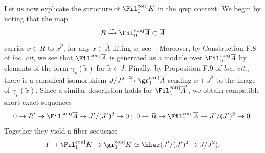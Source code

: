 \documentclass[10pt]{amsart}
\begin{document}
\begin{remark}
\label{rem:fil_1_conj_qrsp}
Let us now explicate the structure of $\Fil^{\mathrm{conj}}_1\overline{K}$ in the qrsp context. We begin by noting that the map 
\[
R\xrightarrow{\simeq}\Fil^{\mathrm{conj}}_0\overline{A}\subset \overline{A}
\]
carries $x\in R$ to $\tilde{x}^p$, for any $\tilde{x}\in \overline{A}$ lifting $x$; see~\cite[Remark F.7]{bhatt2022absolute}. Moreover, by Construction F.8 of \emph{loc. cit}, we see that 
$\Fil^{\mathrm{conj}}_1\overline{A}$ is generated as a module over $\Fil^{\mathrm{conj}}_0\overline{A}$ by elements of the form $\gamma_p(\tilde{x})$ for $\tilde{x}\in J$. Finally, by Proposition F.9 of \emph{loc. cit.}, there is a canonical isomorphism $J/J^2\xrightarrow{\simeq}\gr^{\mathrm{conj}}_1\overline{A}$ sending $\tilde{x}+J^2$ to the image of $\gamma_p(\tilde{x})$. Since a similar description holds for $\Fil^{\mathrm{conj}}_1\overline{A}'$, we obtain compatible short exact sequences
\[
0\to R'\to \Fil^{\mathrm{conj}}_1\overline{A}\to J'/(J')^2\to 0\;;\;0\to R\to \Fil^{\mathrm{conj}}_1\overline{A}\to J'/(J')^2\to 0.
\]
Together they yield a fiber sequence
\[
I \to \Fil^{\mathrm{conj}}_1\overline{K}\to \gr^{\mathrm{conj}}_1\overline{K}\simeq\hker(J'/(J')^2\to J/J^2).
\]
\end{remark}
\end{document}
